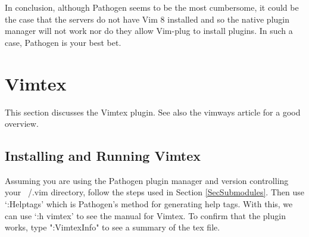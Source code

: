 \documentclass[10pt]{article}
\begin{document}
In conclusion, although Pathogen seems to be the most cumbersome, it could be
the case that the servers do not have Vim 8 installed and so the native plugin
manager will not work nor do they allow Vim-plug to install plugins. In such a
case, Pathogen is your best bet.

\section{Vimtex}
This section discusses the Vimtex \cite{lervag2015vim} plugin. See also the
vimways article \cite{woodruff2019latex} for a good overview.

\subsection{Installing and Running Vimtex}
Assuming you are using the Pathogen plugin manager and version controlling your
~/.vim directory, follow the steps used in Section \ref{SecSubmodules}. Then use
`:Helptags' which is Pathogen's method for generating help tags. With this, we
can use `:h vimtex' to see the manual for Vimtex. To confirm that the plugin
works, type ":VimtexInfo" to see a summary of the tex file.
\end{document}
